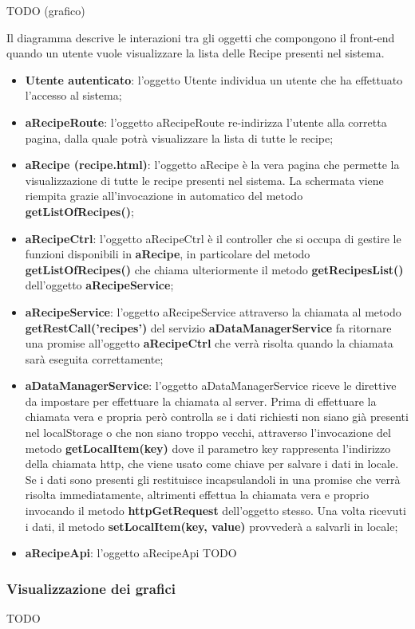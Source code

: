	TODO (grafico) \newline
	\noindent

	Il diagramma descrive le interazioni tra gli oggetti che compongono il front-end quando un utente vuole visualizzare la lista delle Recipe presenti nel sistema.
	\begin{itemize}
		\item \textbf{Utente autenticato}: l'oggetto Utente individua un utente che ha effettuato l'accesso al sistema;
		\item \textbf{aRecipeRoute}: l'oggetto aRecipeRoute re-indirizza l'utente alla corretta pagina, dalla quale potrà visualizzare la lista di tutte le recipe;
		\item \textbf{aRecipe (recipe.html)}: l'oggetto aRecipe è la vera pagina che permette la visualizzazione di tutte le recipe presenti nel sistema. La schermata viene riempita grazie all'invocazione in automatico del metodo \textbf{getListOfRecipes()};
		\item \textbf{aRecipeCtrl}: l'oggetto aRecipeCtrl è il controller che si occupa di gestire le funzioni disponibili in \textbf{aRecipe}, in particolare del metodo \textbf{getListOfRecipes()} che chiama ulteriormente il metodo \textbf{getRecipesList()} dell'oggetto \textbf{aRecipeService};
		\item \textbf{aRecipeService}: l'oggetto aRecipeService attraverso la chiamata al metodo \textbf{getRestCall('recipes')} del servizio \textbf{aDataManagerService} fa ritornare una promise all'oggetto \textbf{aRecipeCtrl} che verrà risolta quando la chiamata sarà eseguita correttamente;
		\item \textbf{aDataManagerService}: l'oggetto aDataManagerService riceve le direttive da impostare per effettuare la chiamata al server. Prima di effettuare la chiamata vera e propria però controlla se i dati richiesti non siano già presenti nel localStorage o che non siano troppo vecchi, attraverso l'invocazione del metodo \textbf{getLocalItem(key)} dove il parametro key rappresenta l'indirizzo della chiamata http, che viene usato come chiave per salvare i dati in locale. Se i dati sono presenti gli restituisce incapsulandoli in una promise che verrà risolta immediatamente, altrimenti effettua la chiamata vera e proprio invocando il metodo \textbf{httpGetRequest} dell'oggetto stesso. Una volta ricevuti i dati, il metodo \textbf{setLocalItem(key, value)} provvederà a salvarli in locale;

		\item \textbf{aRecipeApi}: l'oggetto aRecipeApi TODO
	\end{itemize}

	\subsubsection{Visualizzazione dei grafici} %
	\label{sub:visualizzazione_dei_grafici}
	TODO

